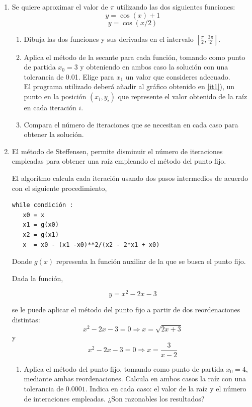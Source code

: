 \begin{paracol}{2}
\begin{enumerate}
\item Se quiere aproximar el valor de $\pi$ utilizando las dos siguientes funciones:
\begin{equation*}
y=\cos(x)+1
\end{equation*}
\begin{equation*}
y=\cos(x/2)
\end{equation*}
\begin{enumerate}
\item \label{it1}Dibuja las dos funciones y sus derivadas en el intervalo $[\frac{\pi}{2},\frac{3\pi}{2}]$.
\item Aplica el método de la secante para cada función, tomando como punto de partida  $x_0=3$ y obteniendo en ambos caso la solución con una tolerancia de 0.01. Elige para $x_1$ un valor que consideres adecuado.\\
El programa utilizado deberá añadir al gráfico obtenido en  \ref{it1}), un punto en la posición $(x_i,y_i)$ que represente el valor obtenido de la raíz en cada iteración $i$.
\item Compara el número de iteraciones que se necesitan en cada caso para obtener la solución.
\end{enumerate}

\item El método de Steffensen, permite disminuir el número de iteraciones empleadas para obtener una raíz empleando el método del punto fijo.

El algoritmo calcula cada iteración usando dos pasos intermedios de acuerdo con el siguiente procedimiento,

\begin{verbatim}
while condición : 
   x0 = x
   x1 = g(x0)
   x2 = g(x1)
   x  = x0 - (x1 -x0)**2/(x2 - 2*x1 + x0)
 \end{verbatim}

Donde $g(x)$ representa la función auxiliar de la que se busca el punto fijo.


Dada la función,

\begin{equation*}
y= x^2-2x-3
\end{equation*} 

se le puede aplicar el método del punto fijo a  partir de dos reordenaciones distintas:
\begin{equation}
x^2-2x-3=0 \Rightarrow x=\sqrt{2x+3}
\end{equation}
y
\begin{equation}
x^2-2x-3=0 \Rightarrow x=\frac{3}{x-2}
\end{equation}
\begin{enumerate}
\item Aplica el método del punto fijo, tomando como punto de partida $x_0=4$, mediante ambas reordenaciones. Calcula en ambos casos la raíz con una tolerancia de $0.0001$. Indica en cada caso: el valor de la raíz y el número de interaciones empleadas.  ¿Son razonables los resultados?


\end{enumerate}
\end{enumerate}
\end{paracol}
